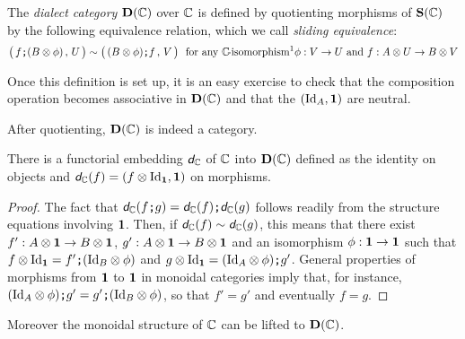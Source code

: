 \begin{definition}
	The \emph{dialect category} $\mathbf D(\mathbb{C})$ over $\mathbb{C}$ is defined by quotienting morphisms of
	$\mathbf S(\mathbb{C})$ by the following equivalence relation, which we call \emph{sliding equivalence}:
		$$\big(\,f\sq(B\monp\phi)\,,\,U\,\big)\eq \big(\,(B\monp\phi)\sq f\,,\,V\,\big) \text{ \ for any 
		$\catf C\!$-isomorphism\footnotemark $\morph\phi VU$ and 
		$\morph f{A\monp U}{B\monp V}$}
		$$
\end{definition}

Once this definition is set up, it is an easy exercise to check that the composition operation
becomes associative in $\mathbf D(\mathbb{C})$ and that the $(\mbox{\normalfont Id}_A, \mathbf 1)$ are neutral.

\begin{proposition}
	After quotienting, $\mathbf D(\mathbb{C})$ is indeed a category.
\end{proposition}

\begin{proposition}
	There is a functorial embedding $\textit{\textsf{d}}_{\mathbb{C}}$ of $\mathbb{C}$ into $\mathbf D(\mathbb{C})$ defined as the identity on
	objects and $\textit{\textsf{d}}_{\mathbb{C}} (f)=(f\otimes \mbox{\normalfont Id}_{\mathbf 1}, \mathbf 1)$ on morphisms.
\end{proposition}

\begin{proof}
	The fact that $\textit{\textsf{d}}_{\mathbb{C}}(f\textbf{\tt;} g)=\textit{\textsf{d}}_{\mathbb{C}}(f) \textbf{\tt;} \textit{\textsf{d}}_{\mathbb{C}}(g)$ follows readily from the structure
	equations involving $\mathbf 1$. Then, if $\textit{\textsf{d}}_{\mathbb{C}}(f) \sim \textit{\textsf{d}}_{\mathbb{C}}(g)$, this means that there
	exist $f':A\otimes \mathbf 1\rightarrow B\otimes \mathbf 1$, 
	$g':A\otimes \mathbf 1\rightarrow B\otimes \mathbf 1$ and an isomorphism $\phi:\mathbf 1\rightarrow \mathbf 1$
	such that $f\otimes\mbox{\normalfont Id}_\mathbf 1=f'\textbf{\tt;} (\mbox{\normalfont Id}_B\otimes\phi)$ and 
	$g\otimes\mbox{\normalfont Id}_\mathbf 1=(\mbox{\normalfont Id}_A\otimes\phi)\textbf{\tt;} g'$. General properties of morphisms from $\mathbf 1$ to
	$\mathbf 1$ in monoidal categories imply that, for instance, $(\mbox{\normalfont Id}_A\otimes\phi)\textbf{\tt;} g'=g'\textbf{\tt;} (\mbox{\normalfont Id}_B\otimes\phi)$,
	so that $f'=g'$ and eventually $f=g$.
\end{proof}

Moreover the monoidal structure of $\mathbb{C}$ can be lifted to $\mathbf D(\mathbb{C})$.

